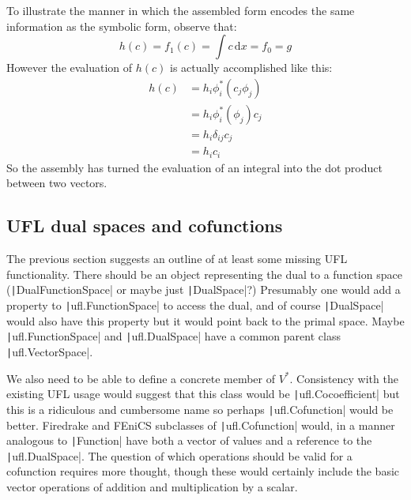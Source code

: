 \documentclass[a4paper,11pt]{article}
\begin{document}
To illustrate the manner in which the assembled form encodes the same information as the symbolic form, observe that:
\begin{equation}
    h(c) = f_1(c) = \int c\,\mathrm{d}x = f_0 = g
\end{equation}
However the evaluation of $h(c)$ is actually accomplished like this:
\begin{equation}
    \begin{split}
        h(c) &=  h_i \phi^*_i(c_j\phi_j)\\
        &= h_i \phi^*_i(\phi_j) c_j\\
        &= h_i \delta_{ij}c_j\\
        &= h_i c_i
    \end{split}
\end{equation}
So the assembly has turned the evaluation of an integral into the dot product between two vectors.

\subsection{UFL dual spaces and cofunctions}

The previous section suggests an outline of at least some missing UFL functionality. There should be an object representing the dual to a function space (\texttt|DualFunctionSpace| or maybe just \texttt|DualSpace|?) Presumably one would add a property to \texttt|ufl.FunctionSpace| to access the dual, and of course \texttt|DualSpace| would also have this property but it would point back to the primal space. Maybe \texttt|ufl.FunctionSpace| and \texttt|ufl.DualSpace| have a common parent class \texttt|ufl.VectorSpace|.

We also need to be able to define a concrete member of $V^*$. Consistency with the existing UFL usage would suggest that this class would be \texttt|ufl.Cocoefficient| but this is a ridiculous and cumbersome name so perhaps \texttt|ufl.Cofunction| would be better. Firedrake and FEniCS subclasses of \texttt|ufl.Cofunction| would, in a manner analogous to \texttt|Function| have both a vector of values and a reference to the \texttt|ufl.DualSpace|. The question of which operations should be valid for a cofunction requires more thought, though these would certainly include the basic vector operations of addition and multiplication by a scalar.
\end{document}

